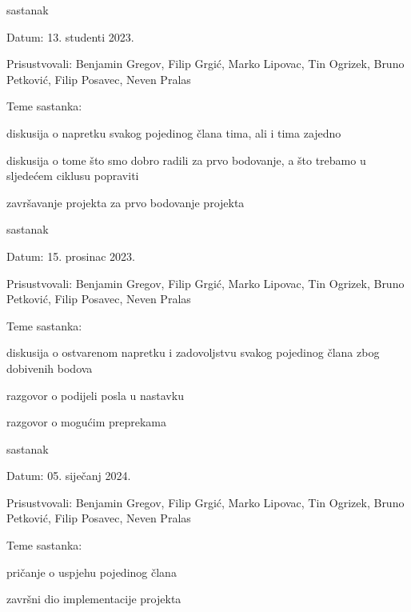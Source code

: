 \begin{packed_enum}
			\item  sastanak
			\item[] \begin{packed_item}
				\item Datum: 13. studenti 2023.
				\item Prisustvovali: Benjamin Gregov, Filip Grgić, Marko Lipovac, Tin Ogrizek, Bruno Petković, Filip Posavec, Neven Pralas
				\item Teme sastanka:
				\begin{packed_item}
					\item  diskusija o napretku svakog pojedinog člana tima, ali i tima zajedno
					\item  diskusija o tome što smo dobro radili za prvo bodovanje, a što trebamo u sljedećem ciklusu popraviti
					\item  završavanje projekta za prvo bodovanje projekta
				\end{packed_item}
			\end{packed_item}
			
				\item  sastanak
			\item[] \begin{packed_item}
				\item Datum: 15. prosinac 2023.
				\item Prisustvovali: Benjamin Gregov, Filip Grgić, Marko Lipovac, Tin Ogrizek, Bruno Petković, Filip Posavec, Neven Pralas
				\item Teme sastanka:
				\begin{packed_item}
					\item  diskusija o ostvarenom napretku i zadovoljstvu svakog pojedinog člana zbog dobivenih bodova
					\item  razgovor o podijeli posla u nastavku 
					\item  razgovor o mogućim preprekama 
				\end{packed_item}
			\end{packed_item}
			
			\item  sastanak
			\item[] \begin{packed_item}
				\item Datum: 05. siječanj 2024.
				\item Prisustvovali: Benjamin Gregov, Filip Grgić, Marko Lipovac, Tin Ogrizek, Bruno Petković, Filip Posavec, Neven Pralas
				\item Teme sastanka:
				\begin{packed_item}
					\item  pričanje o uspjehu pojedinog člana
					\item  završni dio implementacije projekta
				\end{packed_item}
			\end{packed_item}
			

\end{packed_enum}
